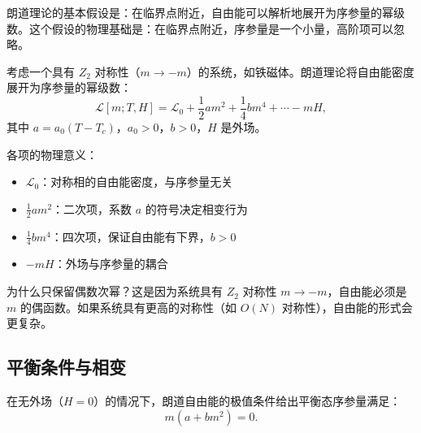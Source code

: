 \begin{note}
朗道理论的基本假设是：在临界点附近，自由能可以解析地展开为序参量的幂级数。这个假设的物理基础是：在临界点附近，序参量是一个小量，高阶项可以忽略。
\end{note}

\begin{definition}[朗道自由能]\label{def:landau_free_energy}
考虑一个具有 $Z_2$ 对称性（$m \to -m$）的系统，如铁磁体。朗道理论将自由能密度展开为序参量的幂级数：
\begin{equation}
    \mathcal{L}[m; T, H] = \mathcal{L}_0 + \frac{1}{2}a m^2 + \frac{1}{4}b m^4 + \cdots - mH,
\end{equation}
其中 $a = a_0(T - T_c)$，$a_0 > 0$，$b > 0$，$H$ 是外场。
\end{definition}

\begin{remark}
各项的物理意义：
\begin{itemize}
    \item $\mathcal{L}_0$：对称相的自由能密度，与序参量无关
    \item $\frac{1}{2}a m^2$：二次项，系数 $a$ 的符号决定相变行为
    \item $\frac{1}{4}b m^4$：四次项，保证自由能有下界，$b > 0$
    \item $-mH$：外场与序参量的耦合
\end{itemize}
为什么只保留偶数次幂？这是因为系统具有 $Z_2$ 对称性 $m \to -m$，自由能必须是 $m$ 的偶函数。如果系统具有更高的对称性（如 $O(N)$ 对称性），自由能的形式会更复杂。
\end{remark}

\subsection{平衡条件与相变}

\begin{theorem}[朗道平衡条件]\label{thm:landau_equilibrium}
在无外场（$H = 0$）的情况下，朗道自由能的极值条件给出平衡态序参量满足：
\begin{equation}
    m(a + b m^2) = 0.
\end{equation}
\end{theorem}

